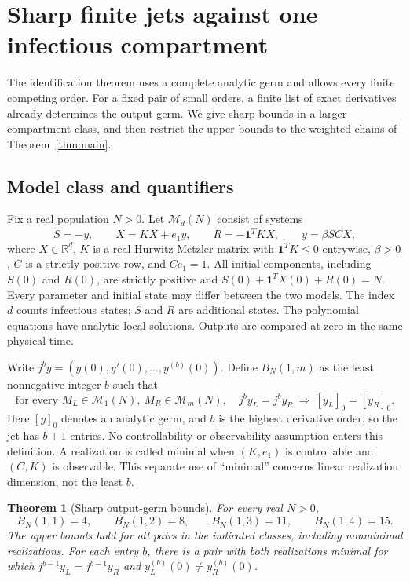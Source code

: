 \documentclass[11pt]{article}
\newtheorem{theorem}{Theorem}[section]
\theoremstyle{remark}\newtheorem{remark}[theorem]{Remark}
\newcommand{\R}{\mathbb R}
\begin{document}
\section{Sharp finite jets against one infectious compartment}\label{sec:finitejet}
The identification theorem uses a complete analytic germ and allows every
finite competing order. For a fixed pair of small orders, a finite list of
exact derivatives already determines the output germ. We give sharp bounds
in a larger compartment class, and then restrict the upper bounds to the
weighted chains of Theorem~\ref{thm:main}.

\subsection{Model class and quantifiers}
Fix a real population $N>0$. Let $\mathcal M_d(N)$ consist of systems
\begin{equation}\label{eq:fjmodel}
 \dot S=-y,\qquad \dot X=KX+e_1y,\qquad
 \dot R=-\mathbf1^TKX,\qquad y=\beta SCX,
\end{equation}
where $X\in\R^d$, $K$ is a real Hurwitz Metzler matrix with
$\mathbf1^TK\leq0$ entrywise, $\beta>0$, $C$ is a strictly positive row,
and $Ce_1=1$. All initial components, including $S(0)$ and $R(0)$,
are strictly positive and $S(0)+\mathbf1^TX(0)+R(0)=N$.
Every parameter and initial state may differ between the two models.
The index $d$ counts infectious states; $S$ and $R$ are additional states.
The polynomial equations have analytic local solutions. Outputs are
compared at zero in the same physical time.

Write $j^b y=(y(0),y'(0),\ldots,y^{(b)}(0))$. Define $B_N(1,m)$ as the
least nonnegative integer $b$ such that
\begin{equation}\label{eq:fjquantifier}
 \text{for every }M_L\in\mathcal M_1(N),\ M_R\in\mathcal M_m(N),\quad
 j^by_L=j^by_R\ \Longrightarrow\ [y_L]_0=[y_R]_0.
\end{equation}
Here $[y]_0$ denotes an analytic germ, and $b$ is the highest derivative
order, so the jet has $b+1$ entries. No controllability or observability
assumption enters this definition. A realization is called minimal when
$(K,e_1)$ is controllable and $(C,K)$ is observable. This separate use of
``minimal'' concerns linear realization dimension, not the least $b$.

\begin{theorem}[Sharp output-germ bounds]\label{thm:fjsharp}
For every real $N>0$,
\[
 B_N(1,1)=4,\qquad B_N(1,2)=8,\qquad
 B_N(1,3)=11,\qquad B_N(1,4)=15.
\]
The upper bounds hold for all pairs in the indicated classes, including
nonminimal realizations. For each entry $b$, there is a pair with both
realizations minimal for which $j^{b-1}y_L=j^{b-1}y_R$ and
$y_L^{(b)}(0)\ne y_R^{(b)}(0)$.
\end{theorem}
\end{document}
